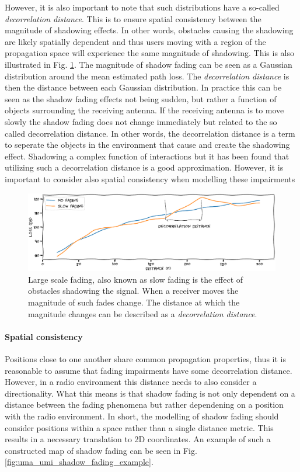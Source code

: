 However, it is also important to note that such distributions have a so-called \emph{decorrelation distance}. This is to ensure spatial consistency between the magnitude of shadowing effects. In other words, obstacles causing the shadowing are likely spatially dependent and thus users moving with a region of the propagation space will experience the same magnitude of shadowing. This is also illustrated in Fig. \ref{fig:shadowing_decorrelation_distance}. The magnitude of shadow fading can be seen as a Gaussian distribution around the mean estimated path loss. The \emph{decorrelation distance} is then the distance between each Gaussian distribution. In practice this can be seen as the shadow fading effects not being sudden, but rather a function of objects surrounding the receiving antenna. If the receiving antenna is to move slowly the shadow fading does not change immediately but related to the so called decorrelation distance. In other words, the decorrelation distance is a term to seperate the objects in the environment that cause and create the shadowing effect. Shadowing a complex function of interactions but it has been found that utilizing such a decorrelation distance is a good approximation. However, it is important to consider also spatial consistency when modelling these impairments


\begin{figure}[h]
    \centering
    \includegraphics{chapters/part_pathloss/figures/slowfading.eps}
    \caption{Large scale fading, also known as slow fading is the effect of obstacles shadowing the signal. When a receiver moves  the magnitude of such fades change. The distance at which the magnitude changes can be described as a \emph{decorrelation distance}.}
    \label{fig:shadowing_decorrelation_distance}
\end{figure}



\paragraph{Spatial consistency}
Positions close to one another share common propagation properties, thus it is reasonable to assume that fading impairments have some decorrelation distance. However, in a radio environment this distance needs to also consider a directionality. What this means is that shadow fading is not only dependent on a distance between the fading phenomena but rather dependening on a position with the radio environment. In short, the modelling of shadow fading should consider positions within a space rather than a single distance metric. This results in a necessary translation to 2D coordinates. An example of such a constructed map of shadow fading can be seen in Fig. \ref{fig:uma_umi_shadow_fading_example}.


